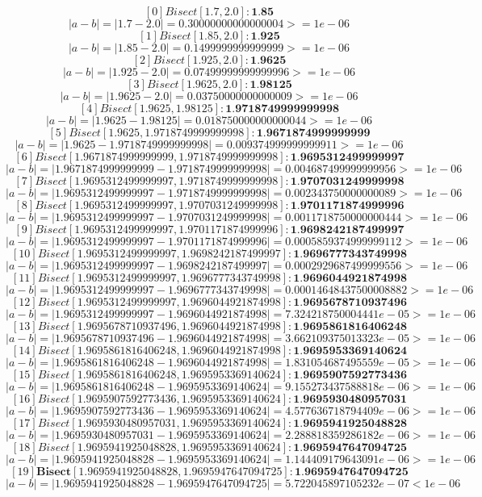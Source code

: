 \documentclass{article}
\begin{document}
    $$ [0] Bisect [1.7, 2.0]: \textbf{1.85} $$ $$ |a - b| = |1.7 - 2.0| = 0.30000000000000004 >= 1e-06 $$
    $$ [1] Bisect [1.85, 2.0]: \textbf{1.925} $$ $$ |a - b| = |1.85 - 2.0| = 0.1499999999999999 >= 1e-06 $$
    $$ [2] Bisect [1.925, 2.0]: \textbf{1.9625} $$ $$ |a - b| = |1.925 - 2.0| = 0.07499999999999996 >= 1e-06 $$
    $$ [3] Bisect [1.9625, 2.0]: \textbf{1.98125} $$ $$ |a - b| = |1.9625 - 2.0| = 0.03750000000000009 >= 1e-06 $$
    $$ [4] Bisect [1.9625, 1.98125]: \textbf{1.9718749999999998} $$ $$ |a - b| = |1.9625 - 1.98125| = 0.018750000000000044 >= 1e-06 $$
    $$ [5] Bisect [1.9625, 1.9718749999999998]: \textbf{1.9671874999999999} $$ $$ |a - b| = |1.9625 - 1.9718749999999998| = 0.009374999999999911 >= 1e-06 $$
    $$ [6] Bisect [1.9671874999999999, 1.9718749999999998]: \textbf{1.9695312499999997} $$ $$ |a - b| = |1.9671874999999999 - 1.9718749999999998| = 0.004687499999999956 >= 1e-06 $$
    $$ [7] Bisect [1.9695312499999997, 1.9718749999999998]: \textbf{1.9707031249999998} $$ $$ |a - b| = |1.9695312499999997 - 1.9718749999999998| = 0.002343750000000089 >= 1e-06 $$
    $$ [8] Bisect [1.9695312499999997, 1.9707031249999998]: \textbf{1.9701171874999996} $$ $$ |a - b| = |1.9695312499999997 - 1.9707031249999998| = 0.0011718750000000444 >= 1e-06 $$
    $$ [9] Bisect [1.9695312499999997, 1.9701171874999996]: \textbf{1.9698242187499997} $$ $$ |a - b| = |1.9695312499999997 - 1.9701171874999996| = 0.0005859374999999112 >= 1e-06 $$
    $$ [10] Bisect [1.9695312499999997, 1.9698242187499997]: \textbf{1.9696777343749998} $$ $$ |a - b| = |1.9695312499999997 - 1.9698242187499997| = 0.0002929687499999556 >= 1e-06 $$
    $$ [11] Bisect [1.9695312499999997, 1.9696777343749998]: \textbf{1.9696044921874998} $$ $$ |a - b| = |1.9695312499999997 - 1.9696777343749998| = 0.00014648437500008882 >= 1e-06 $$
    $$ [12] Bisect [1.9695312499999997, 1.9696044921874998]: \textbf{1.9695678710937496} $$ $$ |a - b| = |1.9695312499999997 - 1.9696044921874998| = 7.324218750004441e-05 >= 1e-06 $$
    $$ [13] Bisect [1.9695678710937496, 1.9696044921874998]: \textbf{1.9695861816406248} $$ $$ |a - b| = |1.9695678710937496 - 1.9696044921874998| = 3.662109375013323e-05 >= 1e-06 $$
    $$ [14] Bisect [1.9695861816406248, 1.9696044921874998]: \textbf{1.9695953369140624} $$ $$ |a - b| = |1.9695861816406248 - 1.9696044921874998| = 1.831054687495559e-05 >= 1e-06 $$
    $$ [15] Bisect [1.9695861816406248, 1.9695953369140624]: \textbf{1.9695907592773436} $$ $$ |a - b| = |1.9695861816406248 - 1.9695953369140624| = 9.155273437588818e-06 >= 1e-06 $$
    $$ [16] Bisect [1.9695907592773436, 1.9695953369140624]: \textbf{1.9695930480957031} $$ $$ |a - b| = |1.9695907592773436 - 1.9695953369140624| = 4.577636718794409e-06 >= 1e-06 $$
    $$ [17] Bisect [1.9695930480957031, 1.9695953369140624]: \textbf{1.9695941925048828} $$ $$ |a - b| = |1.9695930480957031 - 1.9695953369140624| = 2.288818359286182e-06 >= 1e-06 $$
    $$ [18] Bisect [1.9695941925048828, 1.9695953369140624]: \textbf{1.9695947647094725} $$ $$ |a - b| = |1.9695941925048828 - 1.9695953369140624| = 1.144409179643091e-06 >= 1e-06 $$
    $$ [19] \textbf{Bisect} [1.9695941925048828, 1.9695947647094725]: \textbf{1.9695947647094725} $$ $$ |a - b| = |1.9695941925048828 - 1.9695947647094725| = 5.722045897105232e-07 < 1e-06 $$
\end{document}
